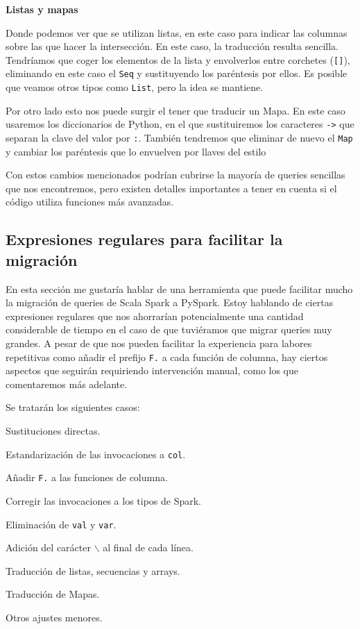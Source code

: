 \documentclass[12pt,twoside,titlepage]{report}
\begin{document}
\textbf{Listas y mapas}

Donde podemos ver que se utilizan listas, en este caso para indicar las columnas sobre las que hacer la intersección. En este caso, la traducción resulta sencilla. Tendríamos que coger los elementos de la lista y envolverlos entre corchetes (\texttt{[]}), eliminando en este caso el \texttt{Seq} y sustituyendo los paréntesis por ellos. Es posible que veamos otros tipos como \texttt{List}, pero la idea se mantiene.

Por otro lado esto nos puede surgir el tener que traducir un Mapa. En este caso usaremos los diccionarios de Python, en el que sustituiremos los caracteres \texttt{->} que separan la clave del valor por \texttt{:}. También tendremos que eliminar de nuevo el \texttt{Map} y cambiar los paréntesis que lo envuelven por llaves del estilo \texttt{{}}

Con estos cambios mencionados podrían cubrirse la mayoría de queries sencillas que nos encontremos, pero existen detalles importantes a tener en cuenta si el código utiliza funciones más avanzadas.

\subsection{Expresiones regulares para facilitar la migración}

En esta sección me gustaría hablar de una herramienta que puede facilitar mucho la migración de queries de Scala Spark a PySpark. Estoy hablando de ciertas expresiones regulares que nos ahorrarían potencialmente una cantidad considerable de tiempo en el caso de que tuviéramos que migrar queries muy grandes. A pesar de que nos pueden facilitar la experiencia para labores repetitivas como añadir el prefijo \texttt{F.} a cada función de columna, hay ciertos aspectos que seguirán requiriendo intervención manual, como los que comentaremos más adelante.

Se tratarán los siguientes casos:

\begin{compactitem}
	\item Sustituciones directas.
	\item Estandarización de las invocaciones a \texttt{col}.
	\item Añadir \texttt{F.} a las funciones de columna.
	\item Corregir las invocaciones a los tipos de Spark.
	\item Eliminación de \texttt{val} y \texttt{var}.
	\item Adición del carácter \texttt{$\backslash$} al final de cada línea.
	\item Traducción de listas, secuencias y arrays.
	\item Traducción de Mapas.
	\item Otros ajustes menores.
\end{compactitem}
\end{document}
